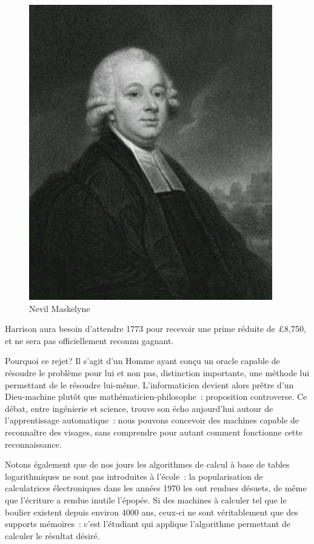 \begin{minipage}[H]{0.49\linewidth}
  \begin{figure}[H]
  \centering
  \includegraphics[height=0.15\paperheight]{../resources/illustrations/maskelyne}
  \caption{Nevil Maskelyne}
  \end{figure}
\end{minipage}

Harrison aura besoin d'attendre 1773 pour recevoir une prime réduite de \pounds{8,750}, et ne sera pas officiellement reconnu gagnant.

Pourquoi ce rejet? Il s'agit d'un Homme ayant conçu un \og oracle\fg{} capable de résoudre le problème pour lui et non pas, distinction importante, une méthode lui permettant de le résoudre lui-même. L'informaticien devient alors prêtre d'un Dieu-machine plutôt que mathématicien-philosophe~: proposition controverse. Ce débat, entre ingénierie et science, trouve son écho aujourd'hui autour de l'apprentissage automatique~: nous pouvons concevoir des machines capable de reconnaître des visages, sans comprendre pour autant comment fonctionne cette reconnaissance. 

Notons également que de nos jours les algorithmes de calcul à base de tables logarithmiques ne sont pas introduites à l'école~: la popularisation de calculatrices électroniques dans les années 1970 les ont rendues désuets, de même que l'écriture a rendue inutile l'épopée. Si des machines à calculer tel que le boulier existent depuis environ 4000 ans, ceux-ci ne sont véritablement que des supports mémoires~: c'est l'étudiant qui applique l'algorithme permettant de calculer le résultat désiré. 

